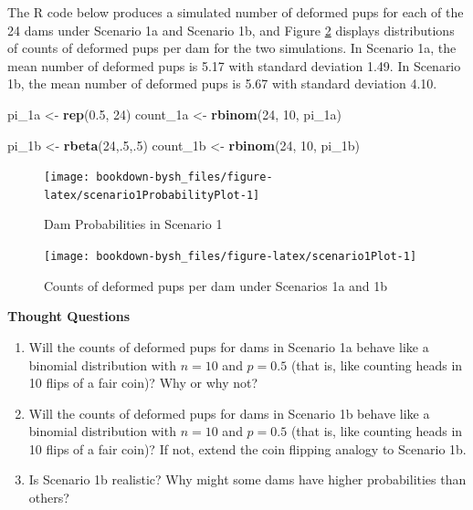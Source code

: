 \documentclass[
]{krantz}
\newenvironment{Shaded}{\begin{snugshade}}{\end{snugshade}}
\newcommand{\DecValTok}[1]{\textcolor[rgb]{0.06,0.06,0.06}{#1}}
\newcommand{\FloatTok}[1]{\textcolor[rgb]{0.06,0.06,0.06}{#1}}
\newcommand{\KeywordTok}[1]{\textcolor[rgb]{0.27,0.27,0.27}{\textbf{#1}}}
\newcommand{\NormalTok}[1]{#1}
\newcommand{\StringTok}[1]{\textcolor[rgb]{0.5,0.5,0.5}{#1}}
\begin{document}
The R code below produces a simulated number of deformed pups for each of the 24 dams under Scenario 1a and Scenario 1b, and Figure \ref{fig:scenario1Plot} displays distributions of counts of deformed pups per dam for the two simulations. In Scenario 1a, the mean number of deformed pups is 5.17 with standard deviation 1.49. In Scenario 1b, the mean number of deformed pups is 5.67 with standard deviation 4.10.

\begin{Shaded}
\begin{Highlighting}[]
\NormalTok{pi_1a <-}\StringTok{ }\KeywordTok{rep}\NormalTok{(}\FloatTok{0.5}\NormalTok{, }\DecValTok{24}\NormalTok{)}
\NormalTok{count_1a <-}\StringTok{ }\KeywordTok{rbinom}\NormalTok{(}\DecValTok{24}\NormalTok{, }\DecValTok{10}\NormalTok{, pi_1a)}

\NormalTok{pi_1b <-}\StringTok{ }\KeywordTok{rbeta}\NormalTok{(}\DecValTok{24}\NormalTok{,.}\DecValTok{5}\NormalTok{,.}\DecValTok{5}\NormalTok{)  }
\NormalTok{count_1b <-}\StringTok{ }\KeywordTok{rbinom}\NormalTok{(}\DecValTok{24}\NormalTok{, }\DecValTok{10}\NormalTok{, pi_1b)  }
\end{Highlighting}
\end{Shaded}

\begin{figure}

{\centering \texttt{[image: bookdown-bysh\_files/figure-latex/scenario1ProbabilityPlot-1]} 

}

\caption{Dam Probabilities in Scenario 1}\label{fig:scenario1ProbabilityPlot}
\end{figure}

\begin{figure}

{\centering \texttt{[image: bookdown-bysh\_files/figure-latex/scenario1Plot-1]} 

}

\caption{Counts of deformed pups per dam under Scenarios 1a and 1b}\label{fig:scenario1Plot}
\end{figure}

\vspace{5mm}

\textbf{Thought Questions}

\begin{enumerate}
\def\labelenumi{\arabic{enumi}.}
\item
  Will the counts of deformed pups for dams in Scenario 1a behave like a binomial distribution with \(n=10\) and \(p=0.5\) (that is, like counting heads in 10 flips of a fair coin)? Why or why not?
\item
  Will the counts of deformed pups for dams in Scenario 1b behave like a binomial distribution with \(n=10\) and \(p=0.5\) (that is, like counting heads in 10 flips of a fair coin)? If not, extend the coin flipping analogy to Scenario 1b.
\item
  Is Scenario 1b realistic? Why might some dams have higher probabilities than others?
\end{enumerate}
\end{document}
